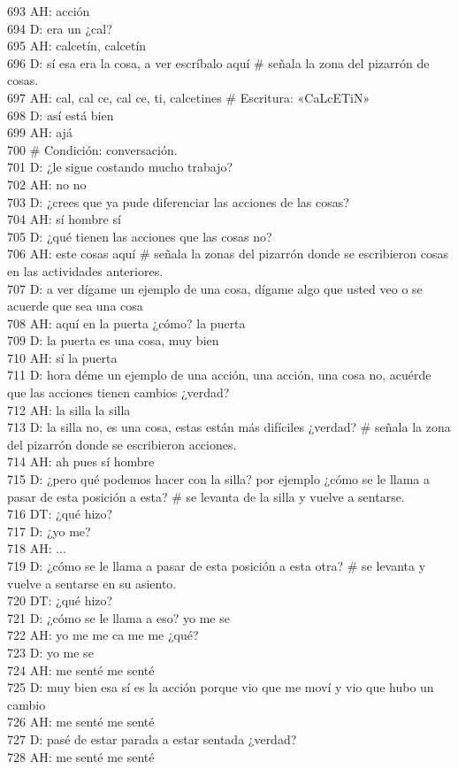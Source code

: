 693 AH: acción\\
694 D: era un ¿cal?\\
695 AH: calcetín, calcetín\\
696 D: sí esa era la cosa, a ver escríbalo aquí \# señala la zona del pizarrón de cosas.\\
697 AH: cal, cal ce, cal ce, ti, calcetines \# Escritura: «CaLcETiN»\\
698 D: así está bien\\
699 AH: ajá\\
700 \# Condición: conversación.\\
701 D: ¿le sigue costando mucho trabajo?\\
702 AH: no no\\
703 D: ¿crees que ya pude diferenciar las acciones de las cosas?\\
704 AH: sí hombre sí\\
705 D: ¿qué tienen las acciones que las cosas no?\\
706 AH: este cosas aquí \# señala la zonas del pizarrón donde se escribieron cosas en las actividades anteriores.\\
707 D: a ver dígame un ejemplo de una cosa, dígame algo que usted veo o se acuerde que sea una cosa\\
708 AH: aquí en la puerta ¿cómo? la puerta\\
709 D: la puerta es una cosa, muy bien\\
710 AH: sí la puerta\\
711 D: hora déme un ejemplo de una acción, una acción, una cosa no, acuérde que las acciones tienen cambios ¿verdad?\\
712 AH: la silla la silla\\
713 D: la silla no, es una cosa, estas están más difíciles ¿verdad? \# señala la zona del pizarrón donde se escribieron acciones.\\
714 AH: ah pues sí hombre\\
715 D: ¿pero qué podemos hacer con la silla? por ejemplo ¿cómo se le llama a pasar de esta posición a esta? \# se levanta de la silla y vuelve a sentarse.\\
716 DT: ¿qué hizo?\\
717 D: ¿yo me?\\
718 AH: ...\\
719 D: ¿cómo se le llama a pasar de esta posición a esta otra? \# se levanta y vuelve a sentarse en su asiento.\\
720 DT: ¿qué hizo?\\
721 D: ¿cómo se le llama a eso? yo me se\\
722 AH: yo me me ca me me ¿qué?\\
723 D: yo me se\\
724 AH: me senté me senté\\
725 D: muy bien esa sí es la acción porque vio que me moví y vio que hubo un cambio\\
726 AH: me senté me senté\\
727 D: pasé de estar parada a estar sentada ¿verdad?\\
728 AH: me senté me senté\\
